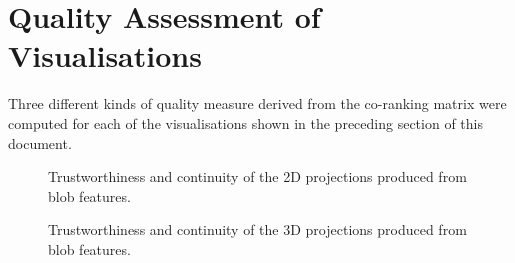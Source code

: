 \section{Quality Assessment of Visualisations}
Three different kinds of quality measure derived from the co-ranking matrix were computed for each of the visualisations shown in the preceding section of this document.


\clearpage
\begin{figure}[H]
	\centering
	\caption{Trustworthiness and continuity of the 2D projections produced from blob features.}\label{fig:TC_2d_blobs}
\end{figure}

\begin{figure}[H]
	\centering
	\caption{Trustworthiness and continuity of the 3D projections produced from blob features.}\label{fig:TC_3d_blobs}
\end{figure}

